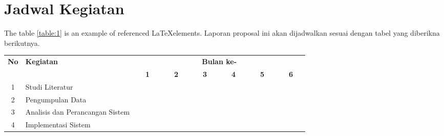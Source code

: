\section{Jadwal Kegiatan}
The table \ref{table:1} is an example of referenced \LaTeX elements. Laporan proposal ini akan dijadwalkan sesuai dengan tabel yang diberikna berikutnya. 

 
\begin{table}[h!]
  \centering
  \begin{tabular}{|c|m{2.5cm}|m{0.01cm}|m{0.01cm}|m{0.01cm}|m{0.01cm}|m{0.01cm}|m{0.01cm}|m{0.01cm}|m{0.01cm}|m{0.01cm}|m{0.01cm}|m{0.01cm}|m{0.01cm}|m{0.01cm}|m{0.01cm}|m{0.01cm}|m{0.01cm}|m{0.01cm}|m{0.01cm}|m{0.01cm}|m{0.01cm}|m{0.01cm}|m{0.01cm}|m{0.01cm}|m{0.01cm}|}
    \hline
    \multirow{2}{*}{\textbf{No}} & \multirow{2}{*}{\textbf{Kegiatan}} & \multicolumn{24}{|c|}{\textbf{Bulan ke-}} \\
    \hhline{~~------------------------}
    {} & {} & \multicolumn{4}{|c|}{\textbf{1}} & \multicolumn{4}{|c|}{\textbf{2}} & \multicolumn{4}{|c|}{\textbf{3}} & \multicolumn{4}{|c|}{\textbf{4}} & \multicolumn{4}{|c|}{\textbf{5}} & \multicolumn{4}{|c|}{\textbf{6}}\\
    \hline
    1 & Studi Literatur & \cellcolor{blue!25} & \cellcolor{blue!25} & \cellcolor{blue!25} & \cellcolor{blue!25}& \cellcolor{blue!25} & \cellcolor{blue!25} & \cellcolor{blue!25} & \cellcolor{blue!25}& \cellcolor{blue!25} & \cellcolor{blue!25} & \cellcolor{blue!25} & \cellcolor{blue!25}& \cellcolor{blue!25} & \cellcolor{blue!25} & \cellcolor{blue!25} & \cellcolor{blue!25}& \cellcolor{blue!25} & \cellcolor{blue!25} & \cellcolor{blue!25} & \cellcolor{blue!25}& \cellcolor{blue!25} & \cellcolor{blue!25} & \cellcolor{blue!25} & \cellcolor{blue!25}\\
    \hline
    2 & Pengumpulan Data & \cellcolor{blue!25} & \cellcolor{blue!25} & \cellcolor{blue!25} & \cellcolor{blue!25} & {} & {} & {} & {} & {} & {} & {} & {}& {} & {} & {} & {}& {} & {} & {} & {}& {} & {} & {} & {}\\
    \hline
    3 & Analisis dan Perancangan Sistem &  {} & {} & {} & {}  & \cellcolor{blue!25} & \cellcolor{blue!25} & \cellcolor{blue!25} & \cellcolor{blue!25} & \cellcolor{blue!25} & \cellcolor{blue!25} & \cellcolor{blue!25} & \cellcolor{blue!25} & {} & {} & {} & {}& {} & {} & {} & {}& {} & {} & {} & {}\\
    \hline
    4 & Implementasi Sistem &  {} & {} & {} & {} & {} & {} & {} & {}& \cellcolor{blue!25} & \cellcolor{blue!25} & \cellcolor{blue!25} & \cellcolor{blue!25} & \cellcolor{blue!25} & \cellcolor{blue!25} & \cellcolor{blue!25} & \cellcolor{blue!25} & {} & {} & {} & {}& {} & {} & {} & {}\\

\end{tabular}
\end{table}
